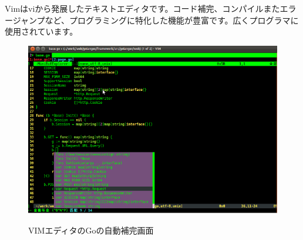 Vimはviから発展したテキストエディタです。コード補完、コンパイルまたエラージャンプなど、プログラミングに特化した機能が豊富です。広くプログラマに使用されています。

\begin{figure}[H]
  \includegraphics[width=14cm]{1.4.vim.png}
   \label{図1.9}
   \caption{VIMエディタのGoの自動補完画面}
\end{figure}


